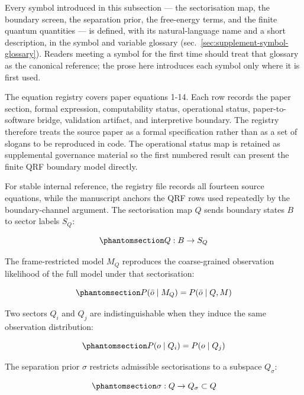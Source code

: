 \documentclass[
]{article}
\begin{document}
Every symbol introduced in this subsection --- the sectorisation map,
the boundary screen, the separation prior, the free-energy terms, and
the finite quantum quantities --- is defined, with its natural-language
name and a short description, in the symbol and variable glossary
(sec.~\ref{sec:supplement-symbol-glossary}). Readers meeting a symbol
for the first time should treat that glossary as the canonical
reference; the prose here introduces each symbol only where it is first
used.

The equation registry covers paper equations 1-14. Each row records the
paper section, formal expression, computability status, operational
status, paper-to-software bridge, validation artifact, and interpretive
boundary. The registry therefore treats the source paper as a formal
specification rather than as a set of slogans to be reproduced in code.
The operational status map is retained as supplemental governance
material so the first numbered result can present the finite QRF
boundary model directly.

For stable internal reference, the registry file records all fourteen
source equations, while the manuscript anchors the QRF rows used
repeatedly by the boundary-channel argument. The sectorisation map \(Q\)
sends boundary states \(B\) to sector labels \(S_Q\):

\begin{equation}\protect\phantomsection\label{eq:7}{
Q: B \rightarrow S_Q
}\end{equation}

The frame-restricted model \(M_Q\) reproduces the coarse-grained
observation likelihood of the full model under that sectorisation:

\begin{equation}\protect\phantomsection\label{eq:8}{
P(\bar{o} \mid M_Q) = P(\bar{o} \mid Q, M)
}\end{equation}

Two sectors \(Q_i\) and \(Q_j\) are indistinguishable when they induce
the same observation distribution:

\begin{equation}\protect\phantomsection\label{eq:9}{
P(o \mid Q_i) = P(o \mid Q_j)
}\end{equation}

The separation prior \(\sigma\) restricts admissible sectorisations to a
subspace \(Q_{\sigma}\):

\begin{equation}\protect\phantomsection\label{eq:10}{
\sigma: Q \rightarrow Q_{\sigma} \subset Q
}\end{equation}
\end{document}
